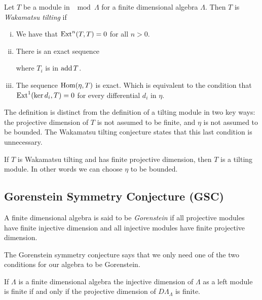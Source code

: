 \begin{defn}
	Let $T$ be a module in $\mod\Lambda$ for a finite dimensional algebra $\Lambda$. Then $T$ is \emph{Wakamatsu tilting} if
	\begin{enumerate}[i)]
		\item We have that $\operatorname{Ext}^n(T,T)=0$ for all $n >0$.
		\item There is an exact sequence 
		\begin{center}
		\end{center}
		where $T_i$ is in $\operatorname{add} T$.
		\item The sequence $\operatorname{Hom}(\eta, T)$ is exact. Which is equivalent to the condition that $\operatorname{Ext}^1(\operatorname{ker} d_i, T)=0$ for every differential $d_i$ in $\eta$.
	\end{enumerate}
\end{defn}

The definition is distinct from the definition of a tilting module in two key ways: the projective dimension of $T$ is not assumed to be finite, and $\eta$ is not assumed to be bounded. The Wakamatsu tilting conjecture states that this last condition is unnecessary.

\begin{conj} 
	If $T$ is Wakamatsu tilting and has finite projective dimension, then $T$ is a tilting module. In other words we can choose $\eta$ to be bounded.
\end{conj}

\subsection*{Gorenstein Symmetry Conjecture (GSC)}

\begin{defn}
	A finite dimensional algebra is said to be \emph{Gorenstein} if all projective modules have finite injective dimension and all injective modules have finite projective dimension.
\end{defn}

The Gorenstein symmetry conjecture says that we only need one of the two conditions for our algebra to be Gorenstein.

\begin{conj} 
	If $\Lambda$ is a finite dimensional algebra the injective dimension of $\Lambda$ as a left module is finite if and only if the projective dimension of $D\Lambda_\Lambda$ is finite.
\end{conj}

